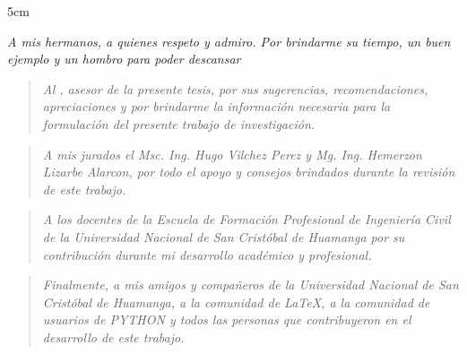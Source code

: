\vspace*{13.5cm}

\begin{hspace}{5cm}
  \begin{minipage}{10cm}
    \emph{A mis hermanos, a quienes respeto y admiro. Por brindarme su tiempo, un buen ejemplo y un hombro para poder descansar}
  \end{minipage}
\end{hspace}



\begin{quote}
  \emph{Al \asesor, asesor de la presente tesis, por sus sugerencias, recomendaciones, apreciaciones y por brindarme la información necesaria para la formulación del presente trabajo de investigación.}
\end{quote}

\begin{quote}
	\emph{A mis jurados el Msc. Ing. Hugo Vilchez Perez y Mg. Ing. Hemerzon Lizarbe Alarcon, por todo el apoyo y consejos brindados durante la revisión de este trabajo.}
\end{quote}

\begin{quote}
	\emph{A los docentes de la Escuela de Formación Profesional de Ingeniería Civil de la Universidad Nacional de San Cristóbal de Huamanga por su contribución durante mi desarrollo académico y profesional.}
\end{quote}

\begin{quote}
	\emph{Finalmente, a mis amigos y compañeros de la Universidad Nacional de San Cristóbal de Huamanga, a la comunidad de \LaTeX, a la comunidad de usuarios de PYTHON y todos las personas que contribuyeron en el desarrollo de este trabajo.}
\end{quote}

\vspace{2cm}
\begin{flushright}
  \\[0cm]
  \textit{\autor}
\end{flushright}



